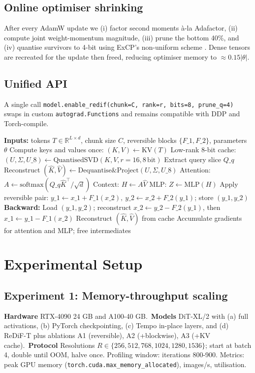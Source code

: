 \documentclass{article}
\begin{document}
\subsection{Online optimiser shrinking}
After every AdamW update we (i) factor second moments à-la Adafactor, (ii) compute joint weight-momentum magnitude, (iii) prune the bottom 40\%, and (iv) quantise survivors to 4-bit using ExCP’s non-uniform scheme \cite{li-2024-excp}. Dense tensors are recreated for the update then freed, reducing optimiser memory to \(\approx 0.15\lvert\theta\rvert\).
\subsection{Unified API}
A single call \texttt{model.enable\_redif(chunk=C, rank=r, bits=8, prune\_q=4)} swaps in custom \texttt{autograd.Functions} and remains compatible with DDP and Torch-compile.
\begin{algorithm}[H]
\caption{Chunked forward-backward with reversible U-blocks and low-rank KV cache}
\begin{algorithmic}[1]
\State \textbf{Inputs:} tokens \(T\in\mathbb{R}^{L\times d}\), chunk size \(C\), reversible blocks \(\{F\_1,F\_2\}\), parameters \(\theta\)
\State Compute keys and values once: \((K,V)\leftarrow \mathrm{KV}(T)\)
\State Low-rank 8-bit cache: \((U,\Sigma,U\_8)\leftarrow \mathrm{QuantisedSVD}(K,V, r=16, 8\,\mathrm{bit})\)
  \State Extract query slice \(Q\_q\)
  \State Reconstruct \((\hat{K},\hat{V}) \leftarrow \mathrm{Dequantise\&Project}(U,\Sigma,U\_8)\)
  \State Attention: \(A\leftarrow \mathrm{softmax}(Q\_q\hat{K}^\top/\sqrt{d})\)
  \State Context: \(H\leftarrow A\hat{V}\)
  \State MLP: \(Z\leftarrow \mathrm{MLP}(H)\)
  \State Apply reversible pair: \(y\_1\leftarrow x\_1+F\_1(x\_2),\ y\_2\leftarrow x\_2+F\_2(y\_1)\); store \((y\_1,y\_2)\)
\EndFor
\State \textbf{Backward:}
  \State Load \((y\_1,y\_2)\); reconstruct \(x\_2\leftarrow y\_2-F\_2(y\_1)\), then \(x\_1\leftarrow y\_1-F\_1(x\_2)\)
  \State Reconstruct \((\hat{K},\hat{V})\) from cache
  \State Accumulate gradients for attention and MLP; free intermediates
\EndFor
\end{algorithmic}
\end{algorithm}

\section{Experimental Setup}
\subsection{Experiment 1: Memory-throughput scaling}
\textbf{Hardware} RTX-4090 24 GB and A100-40 GB.\
\textbf{Models} DiT-XL/2 with (a) full activations, (b) PyTorch checkpointing, (c) Tempo in-place layers, and (d) ReDiF-T plus ablations A1 (reversible), A2 (+blockwise), A3 (+KV cache).\
\textbf{Protocol} Resolutions \(R \in \{256,512,768,1024,1280,1536\}\); start at batch 4, double until OOM, halve once. Profiling window: iterations 800-900. Metrics: peak GPU memory (\texttt{torch.cuda.max\_memory\_allocated}), images/s, utilisation.
\end{document}
